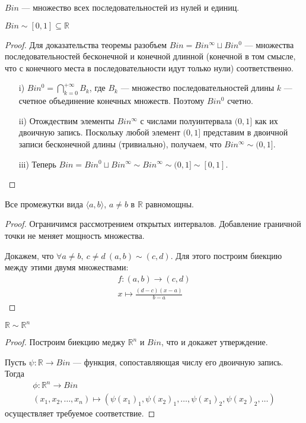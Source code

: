 \begin{definition}
    $Bin$ --- множество всех последовательностей из нулей и единиц.
\end{definition}

\begin{theorem}
    $Bin \sim [0, 1] \subseteq \mathbb{R}$
\end{theorem}
\begin{proof}
    Для доказательства теоремы разобъем $Bin = Bin^{\infty} \sqcup Bin^0$ ---
    множества последовательностей бесконечной и конечной длинной (конечной в том
    смысле, что с конечного места в последовательности идут только нули)
    соответственно.
    \begin{itemize}
        \item[i)] $Bin^0 = \bigcap_{k=0}^{+\infty}{B_k}$, где $B_k$ --- множество
        последовательностей длины $k$ --- счетное объединение конечных множеств.
        Поэтому $Bin^0$ счетно.
        \item[ii)] Отождествим элементы $Bin^{\infty}$ с числами полуинтервала
        $(0, 1]$ как их двоичную запись. Поскольку любой элемент $(0, 1]$
        представим в двоичной записи бесконечной длины (тривиально), получаем,
        что $Bin^{\infty} \sim (0, 1]$.
        \item[iii)] Теперь $Bin = Bin^0 \sqcup Bin^{\infty} \sim Bin^{\infty}
        \sim (0, 1] \sim [0, 1]$.
    \end{itemize}
\end{proof}

\begin{theorem}
    Все промежутки вида $\langle a, b \rangle$, $a \neq b$ в $\mathbb{R}$
    равномощны.
\end{theorem}
\begin{proof}
    Ограничимся рассмотрением открытых интервалов. Добавление граничной точки
    не меняет мощность множества.

    Докажем, что $\forall a \neq b,~ c \neq d~(a, b) \sim (c, d)$.
    Для этого построим биекцию между этими двумя множествами:
    \begin{gather*}
        f \colon (a, b) \to (c, d) \\
        x \longmapsto \frac{(d - c)(x - a)}{b - a}
    \end{gather*}
\end{proof}

\begin{theorem}
    $\mathbb{R} \sim \mathbb{R}^n$
\end{theorem}
\begin{proof}
    Построим биекцию меджу $\mathbb{R}^n$ и $Bin$, что и докажет утверждение.

    Пусть $\psi \colon \mathbb{R} \to Bin$ --- функция, сопоставляющая
    числу его двоичную запись. Тогда
    \begin{gather*}
        \phi \colon \mathbb{R}^n \to Bin \\
        (x_1, x_2, \ldots, x_n) \longmapsto (\psi(x_1)_1, \psi(x_2)_1, \ldots,
        \psi(x_1)_2, \psi(x_2)_2, \ldots)
    \end{gather*}
    осуществляет требуемое соответствие.
\end{proof}

